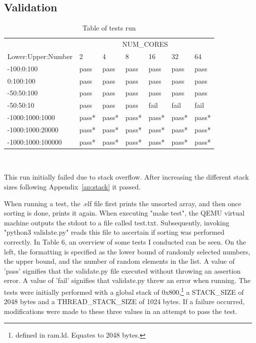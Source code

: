 \subsection{Validation}\label{sec:validate}
\begin{table}
  \caption{Table of tests run}\label{tab:tests}
  \begin{center}
    \begin{tabular}[c]{l|l|l|l|l|l|l}
      & \multicolumn{6}{c}{NUM\_CORES}\\
      \cline{2-7}
      Lower:Upper:Number & 2 & 4 & 8 & 16 & 32 & 64\\
      \hline
      -100:0:100 & pass & pass & pass & pass & pass & pass \\
      \hline
      0:100:100 & pass & pass & pass & pass & pass & pass\\
      \hline
      -50:50:100 & pass & pass & pass & pass & pass & pass \\
      \hline
      -50:50:10 & pass & pass & pass & fail & fail & fail \\
      \hline
      -1000:1000:1000 & pass* & pass* & pass* & pass* & pass* & pass* \\
      \hline
      -1000:1000:20000 & pass* & pass* & pass* & pass* & pass* & pass* \\
      \hline
      -1000:1000:100000 & pass* & pass* & pass* & pass* & pass* & pass* \\
    \end{tabular} \\
    \vspace{1em}
    \raggedright{\footnotesize *This run initially failed due to stack overflow.
    After increasing the different stack sizes following Appendix~\ref{ap:stack}
  it passed.} \\
  \end{center}
\end{table}

When running a test, the .elf file first prints the unsorted array, and then
once sorting is done, prints it again. When executing "make test", the QEMU
virtual machine outputs the stdout to a file called test.txt. Subsequently,
invoking "python3 validate.py" reads this file to ascertain if sorting was
performed correctly. In Table 6, an overview of some tests I conducted can be
seen. On the left, the formatting is specified as the lower bound of randomly
selected numbers, the upper bound, and the number of random elements in the
list. A value of 'pass' signifies that the validate.py file executed without
throwing an assertion error. A value of 'fail' signifies that validate.py threw
an error when running. The tests were initially performed with a global stack of
0x800,\footnote{defined in ram.ld. Equates to 2048 bytes.} a STACK\_SIZE of 2048
bytes and a THREAD\_STACK\_SIZE of 1024 bytes. If a failure occurred,
modifications were made to these three values in an attempt to pass the test.


